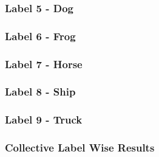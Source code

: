 \subsubsection{Label 5 - Dog}
\subsubsection{Label 6 - Frog}
\subsubsection{Label 7 - Horse}
\subsubsection{Label 8 - Ship}
\subsubsection{Label 9 - Truck}
\subsubsection{Collective Label Wise Results}